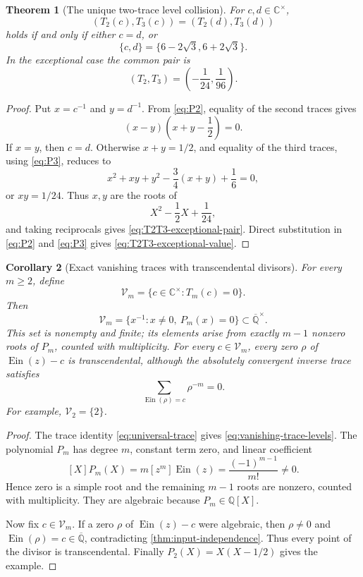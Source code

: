 \documentclass[11pt]{article}
\theoremstyle{keio}
\newtheorem{theorem}{Theorem}[section]
\newtheorem{corollary}[theorem]{Corollary}
\theoremstyle{definition}
\theoremstyle{remark}
\newcommand{\Q}{\mathbb Q}
\newcommand{\Qbar}{\overline{\mathbb Q}}
\newcommand{\C}{\mathbb C}
\newcommand{\Ein}{\operatorname{Ein}}
\begin{document}
\begin{theorem}[The unique two-trace level collision]
\label{thm:T2T3-collision}
For \(c,d\in\C^\times\),
\[
 (T_2(c),T_3(c))=(T_2(d),T_3(d))
\]
holds if and only if either \(c=d\), or
\begin{equation}\label{eq:T2T3-exceptional-pair}
 \boxed{\{c,d\}=\{6-2\sqrt3,6+2\sqrt3\}.}
\end{equation}
In the exceptional case the common pair is
\begin{equation}\label{eq:T2T3-exceptional-value}
 \boxed{(T_2,T_3)=\left(-\frac1{24},\frac1{96}\right).}
\end{equation}
\end{theorem}

\begin{proof}
Put \(x=c^{-1}\) and \(y=d^{-1}\).  From \eqref{eq:P2}, equality of the
second traces gives
\[
 (x-y)\left(x+y-\frac12\right)=0.
\]
If \(x=y\), then \(c=d\).  Otherwise \(x+y=1/2\), and equality of the
third traces, using \eqref{eq:P3}, reduces to
\[
 x^2+xy+y^2-\frac34(x+y)+\frac16=0,
\]
or \(xy=1/24\).  Thus \(x,y\) are the roots of
\[
 X^2-\frac12X+\frac1{24},
\]
and taking reciprocals gives \eqref{eq:T2T3-exceptional-pair}.  Direct
substitution in \eqref{eq:P2} and \eqref{eq:P3} gives
\eqref{eq:T2T3-exceptional-value}.
\end{proof}

\begin{corollary}[Exact vanishing traces with transcendental divisors]
\label{cor:vanishing-trace-levels}
For every \(m\ge2\), define
\[
 \mathcal V_m=
 \{c\in\C^\times:T_m(c)=0\}.
\]
Then
\begin{equation}\label{eq:vanishing-trace-levels}
 \boxed{\mathcal V_m=
 \{x^{-1}:x\ne0,\ P_m(x)=0\}\subset\Qbar^\times.}
\end{equation}
This set is nonempty and finite; its elements arise from exactly \(m-1\)
nonzero roots of \(P_m\), counted with multiplicity.  For every
\(c\in\mathcal V_m\), every zero \(\rho\) of \(\Ein(z)-c\) is
transcendental, although the absolutely convergent inverse trace satisfies
\[
 \sum_{\Ein(\rho)=c}\rho^{-m}=0.
\]
For example, \(\mathcal V_2=\{2\}\).
\end{corollary}

\begin{proof}
The trace identity \eqref{eq:universal-trace} gives
\eqref{eq:vanishing-trace-levels}.  The polynomial \(P_m\) has degree
\(m\), constant term zero, and linear coefficient
\[
 [X]P_m(X)=m[z^m]\Ein(z)=\frac{(-1)^{m-1}}{m!}\ne0.
\]
Hence zero is a simple root and the remaining \(m-1\) roots are nonzero,
counted with multiplicity.  They are algebraic because \(P_m\in\Q[X]\).

Now fix \(c\in\mathcal V_m\).  If a zero \(\rho\) of \(\Ein(z)-c\) were
algebraic, then \(\rho\ne0\) and
\(\Ein(\rho)=c\in\Qbar\), contradicting
\cref{thm:input-independence}.  Thus every point of the divisor is
transcendental.  Finally \(P_2(X)=X(X-1/2)\) gives the example.
\end{proof}
\end{document}
